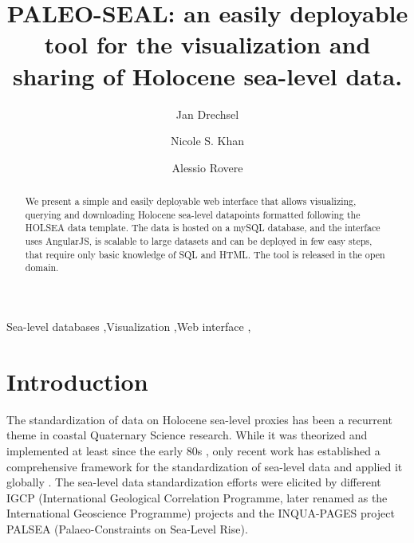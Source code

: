 \documentclass[a4paper,fleqn]{cas-dc}
\begin{document}
\let\WriteBookmarks\relax
\def\floatpagepagefraction{1}
\def\textpagefraction{.001}

\title [mode = title]{PALEO-SEAL: an easily deployable tool for the visualization and sharing of Holocene sea-level data.}                      

\author[1]{Jan Drechsel}
\address[1]{MARUM, Center for Marine Environmental Sciences, University of Bremen, Germany}

\author[2]{Nicole S. Khan}
\address[2]{Department of Earth Sciences and Swire Institute of Marine Science, University of Hong Kong, Hong Kong}

\author[1]{Alessio Rovere}
\cormark[1]

\begin{abstract}
We present a simple and easily deployable web interface that allows visualizing, querying and downloading Holocene sea-level datapoints formatted following the HOLSEA data template. The data is hosted on a mySQL database, and the interface uses AngularJS, is scalable to large datasets and can be deployed in few easy steps, that require only basic knowledge of SQL and HTML. The tool is released in the open domain.

\end{abstract}

\begin{keywords}
Sea-level databases \sep Visualization \sep Web interface \sep 
\end{keywords}

\maketitle

\section{Introduction}
The standardization of data on Holocene sea-level proxies has been a recurrent theme in coastal Quaternary Science research. While it was theorized and implemented at least since the early 80s \citep{shennan1982,shennan1983,VanDePlassche1986}, only recent work has established a comprehensive framework for the standardization of sea-level data and applied it globally \citep{khan2019}. The sea-level data standardization efforts were elicited by different IGCP (International Geological Correlation Programme, later renamed as the International Geoscience Programme) projects and the INQUA-PAGES project PALSEA (Palaeo-Constraints on Sea-Level Rise). 
\end{document}
